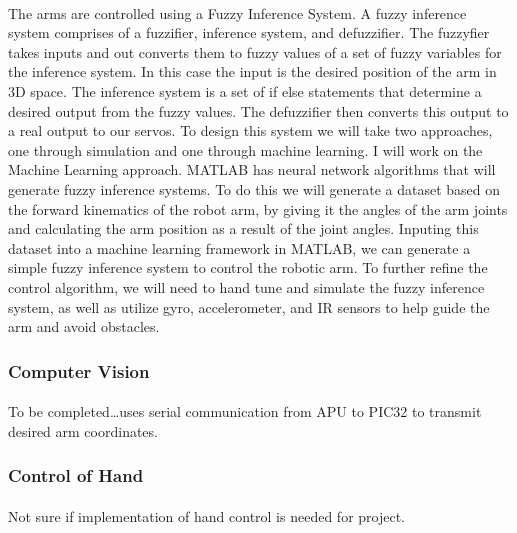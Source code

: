 \documentclass[letterpaper,12pt]{article}
\begin{document}
\paragraph{} The arms are controlled using a Fuzzy Inference System. A fuzzy
inference system comprises of a fuzzifier, inference system, and defuzzifier.
The fuzzyfier takes inputs and out converts them to fuzzy values of a set of
fuzzy variables for the inference system. In this case the input is the desired
position of the arm in 3D space. The inference system is a set of if else
statements that determine a desired output from the fuzzy values. The
defuzzifier then converts this output to a real output to our
servos\cite{fuzzy2011}. To design this system we will take two approaches, one
through simulation and one through machine learning. I will work on the Machine
Learning approach. MATLAB has neural network algorithms that will generate fuzzy
inference systems. To do this we will generate a dataset based on the forward
kinematics of the robot arm, by giving it the angles of the arm joints and
calculating the arm position as a result of the joint angles. Inputing this
dataset into a machine learning framework in MATLAB, we can generate a simple
fuzzy inference system to control the robotic arm\cite{fuzzymatlab}. To further
refine the control algorithm, we will need to hand tune and simulate the fuzzy
inference system, as well as utilize gyro, accelerometer, and IR sensors to help
guide the arm and avoid obstacles.

\subsubsection{Computer Vision}
\paragraph{} To be completed\dots uses serial communication from APU to PIC32 to
transmit desired arm coordinates.

\subsubsection{Control of Hand}
\paragraph{} Not sure if implementation of hand control is needed for project.

\printbibliography
\end{document}
